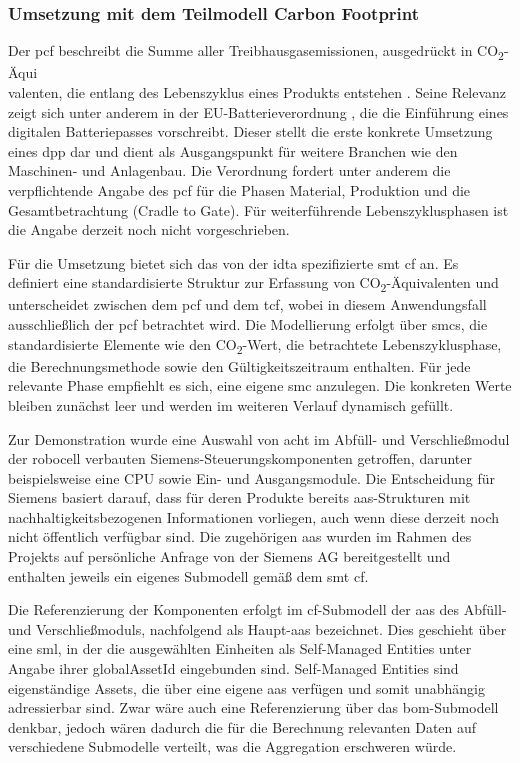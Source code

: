 \subsubsection{Umsetzung mit dem Teilmodell Carbon Footprint}
Der \acs{pcf} beschreibt die Summe aller Treibhausgasemissionen, ausgedrückt in CO\textsubscript{2}-Äqui\\valenten, die entlang des Lebenszyklus eines Produkts entstehen \cite{PCF}. 
Seine Relevanz zeigt sich unter anderem in der EU-Batterieverordnung \cite{EUVerordnung}, die die Einführung eines digitalen Batteriepasses vorschreibt. 
Dieser stellt die erste konkrete Umsetzung eines \acs{dpp} dar und dient als Ausgangspunkt für weitere Branchen wie den Maschinen- und Anlagenbau. 
Die Verordnung fordert unter anderem die verpflichtende Angabe des \acs{pcf} für die Phasen Material, Produktion und die Gesamtbetrachtung (Cradle to Gate). 
Für weiterführende Lebenszyklusphasen ist die Angabe derzeit noch nicht vorgeschrieben.

Für die Umsetzung bietet sich das von der \acs{idta} spezifizierte \acs{smt} \acs{cf} \cite{SpezifikaitonPCF} an.
Es definiert eine standardisierte Struktur zur Erfassung von CO\textsubscript{2}-Äquivalenten und unterscheidet zwischen dem \acs{pcf} und dem \ac{tcf}, wobei in diesem Anwendungsfall ausschließlich der \acs{pcf} betrachtet wird.
Die Modellierung erfolgt über \acsp{smc}, die standardisierte Elemente wie den CO\textsubscript{2}-Wert, die betrachtete Lebenszyklusphase, die Berechnungsmethode sowie den Gültigkeitszeitraum enthalten.
Für jede relevante Phase empfiehlt es sich, eine eigene \acs{smc} anzulegen.
Die konkreten Werte bleiben zunächst leer und werden im weiteren Verlauf dynamisch gefüllt.

Zur Demonstration wurde eine Auswahl von acht im Abfüll- und Verschließmodul der robocell verbauten Siemens-Steuerungskomponenten getroffen, darunter beispielsweise eine CPU sowie Ein- und Ausgangsmodule.
Die Entscheidung für Siemens basiert darauf, dass für deren Produkte bereits \acs{aas}-Strukturen mit nachhaltigkeitsbezogenen Informationen vorliegen, auch wenn diese derzeit noch nicht öffentlich verfügbar sind.
Die zugehörigen \acs{aas} wurden im Rahmen des Projekts auf persönliche Anfrage von der Siemens AG bereitgestellt und enthalten jeweils ein eigenes Submodell gemäß dem \acs{smt} \acs{cf}.

\clearpage
Die Referenzierung der Komponenten erfolgt im \acs{cf}-Submodell der \acs{aas} des Abfüll- und Verschließmoduls, nachfolgend als Haupt-\acs{aas} bezeichnet.
Dies geschieht über eine \acs{sml}, in der die ausgewählten Einheiten als Self-Managed Entities unter Angabe ihrer globalAssetId eingebunden sind.
Self-Managed Entities sind eigenständige Assets, die über eine eigene \acs{aas} verfügen und somit unabhängig adressierbar sind.
Zwar wäre auch eine Referenzierung über das \acs{bom}-Submodell denkbar, jedoch wären dadurch die für die Berechnung relevanten Daten auf verschiedene Submodelle verteilt, was die Aggregation erschweren würde.

